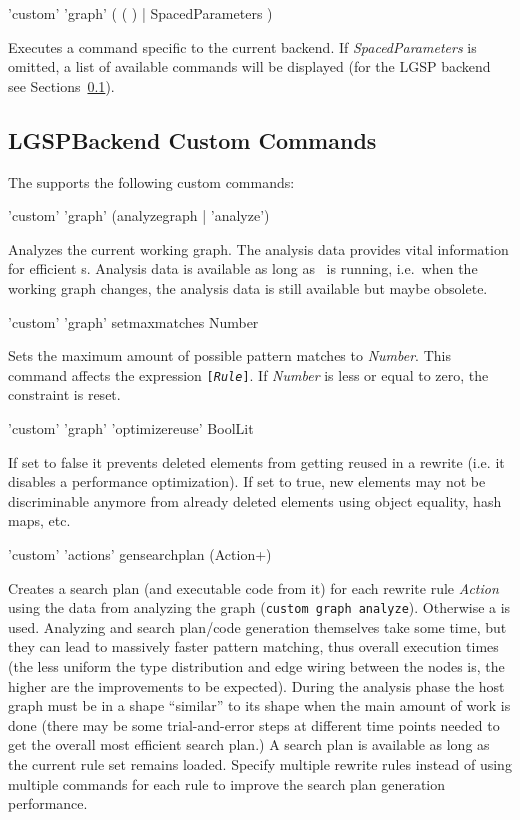 \begin{rail}
  'custom' 'graph' ( ( ) | SpacedParameters )
\end{rail}
Executes a command specific to the current backend.
If \emph{SpacedParameters} is omitted, a list of available commands will be displayed (for the LGSP backend see Sections~\ref{custom}).


\subsection{LGSPBackend Custom Commands}
\label{custom}

The  supports the following custom commands:

\begin{rail}
  'custom' 'graph' (analyzegraph | 'analyze') 
\end{rail}
Analyzes the current working graph.
The analysis data provides vital information for efficient s.
Analysis data is available as long as \GrShell\ is running, i.e.\ when the working graph changes, the analysis data is still available but maybe obsolete.

\begin{rail}
  'custom' 'graph' setmaxmatches Number
\end{rail}
Sets the maximum amount of possible pattern matches to \emph{Number}.
This command affects the expression \texttt{[\emph{Rule}]}.
If \emph{Number} is less or equal to zero, the constraint is reset.

\begin{rail}
  'custom' 'graph' 'optimizereuse' BoolLit
\end{rail}
If set to false it prevents deleted elements from getting reused in a rewrite (i.e. it disables a performance optimization).
If set to true, new elements may not be discriminable anymore from already deleted elements using object equality, hash maps, etc.
					
\begin{rail}
  'custom' 'actions' gensearchplan (Action+)
\end{rail}
Creates a search plan (and executable code from it) for each rewrite rule \emph{Action} using the data from analyzing the graph (\texttt{custom graph analyze}).
Otherwise a  is used. 
Analyzing and search plan/code generation themselves take some time, but they can lead to massively faster pattern matching, thus overall execution times
(the less uniform the type distribution and edge wiring between the nodes is, the higher are the improvements to be expected).
During the analysis phase the host graph must be in a shape ``similar'' to its shape when the main amount of work is done
(there may be some trial-and-error steps at different time points needed to get the overall most efficient search plan.)
A search plan is available as long as the current rule set remains loaded. 
Specify multiple rewrite rules instead of using multiple commands for each rule to improve the search plan generation performance.

